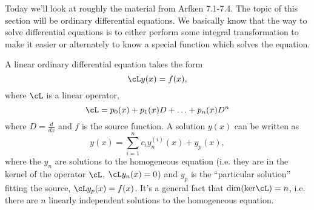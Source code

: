 Today we'll look at roughly the material from Arfken 7.1-7.4. The topic of this section will be ordinary differential equations. We basically know that the way to solve differential equations is to either perform some integral transformation to make it easier or alternately to know a special function which solves the equation.

A linear ordinary differential equation takes the form
\begin{equation}
    \cL y(x) = f(x),
\end{equation}
where $\cL$ is a linear operator,
\begin{equation}
    \cL = p_0(x) + p_1(x) D + \ldots + p_n(x) D^n
\end{equation}
where $D=\frac{d}{dx}$ and $f$ is the source function. A solution $y(x)$ can be written as
\begin{equation}
    y(x) =\sum_{i=1}^n c_i y_n^{(i)}(x) + y_p(x),
\end{equation}
where the $y_n$ are solutions to the homogeneous equation (i.e. they are in the kernel of the operator $\cL$, $\cL y_n(x)=0$) and $y_p$ is the ``particular solution'' fitting the source, $\cL y_p(x) = f(x)$. It's a general fact that $\dim(\text{ker}\cL)=n$, i.e. there are $n$ linearly independent solutions to the homogeneous equation.

